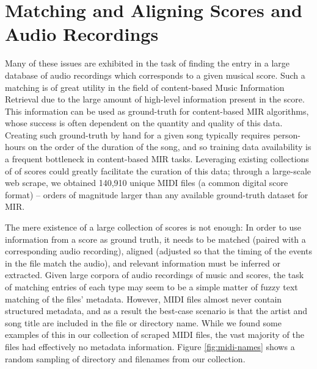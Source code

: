 \section{Matching and Aligning Scores and Audio Recordings}

Many of these issues are exhibited in the task of finding the entry in a large database of audio recordings which corresponds to a given musical score.
Such a matching is of great utility in the field of content-based Music Information Retrieval due to the large amount of high-level information present in the score.
This information can be used as ground-truth for content-based MIR algorithms, whose success is often dependent on the quantity and quality of this data.
Creating such ground-truth by hand for a given song typically requires person-hours on the order of the duration of the song, and so training data availability is a frequent bottleneck in content-based MIR tasks.
Leveraging existing collections of of scores could greatly facilitate the curation of this data; through a large-scale web scrape, we obtained 140,910 unique MIDI files (a common digital score format) -- orders of magnitude larger than any available ground-truth dataset for MIR.

The mere existence of a large collection of scores is not enough:  In order to use information from a score as ground truth, it needs to be matched (paired with a corresponding audio recording), aligned (adjusted so that the timing of the events in the file match the audio), and relevant information must be inferred or extracted.
Given large corpora of audio recordings of music and scores, the task of matching entries of each type may seem to be a simple matter of fuzzy text matching of the files' metadata.
However, MIDI files almost never contain structured metadata, and as a result the best-case scenario is that the artist and song title are included in the file or directory name.
While we found some examples of this in our collection of scraped MIDI files, the vast majority of the files had effectively no metadata information.
Figure \ref{fig:midi-names} shows a random sampling of directory and filenames from our collection.

